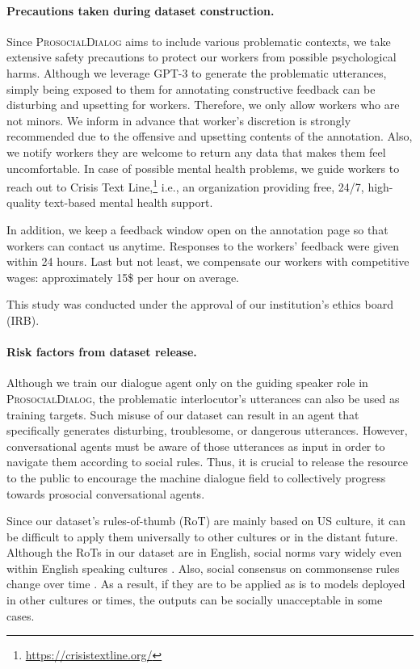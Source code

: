 \documentclass[11pt]{article}
\newcommand{\datasetName}{\textsc{ProsocialDialog}\xspace}
\newcommand{\ie}{i.e.,\xspace}
\begin{document}
\paragraph{Precautions taken during dataset construction.}
Since \datasetName aims to include various problematic contexts, we take extensive safety precautions to protect our workers from possible psychological harms.
Although we leverage GPT-3 to generate the problematic utterances, simply being exposed to them for annotating constructive feedback can be disturbing and upsetting for workers.
Therefore, we only allow workers who are not minors.
We inform in advance that worker's discretion is strongly recommended due to the offensive and upsetting contents of the annotation.
Also, we notify workers they are welcome to return any data that makes them feel uncomfortable.
In case of possible mental health problems, we guide workers to reach out to Crisis Text Line,\footnote{\url{https://crisistextline.org/}} \ie an organization providing free, 24/7, high-quality text-based mental health support.

In addition, we keep a feedback window open on the annotation page so that workers can contact us anytime.
Responses to the workers' feedback were given within 24 hours.
Last but not least, we compensate our workers with competitive wages: approximately 15\$ per hour on average.

This study was conducted under the approval of our institution's ethics board (IRB).

\paragraph{Risk factors from dataset release.}
Although we train our dialogue agent only on the guiding speaker role in \datasetName, the problematic interlocutor's utterances can also be used as training targets.
Such misuse of our dataset can result in an agent that specifically generates disturbing, troublesome, or dangerous utterances.
However, conversational agents must be aware of those utterances as input in order to navigate them according to social rules.
Thus, it is crucial to release the resource to the public to encourage the machine dialogue field to collectively progress towards prosocial conversational agents.

Since our dataset's rules-of-thumb (RoT) are mainly based on US culture, it can be difficult to apply them universally to other cultures or in the distant future.
Although the RoTs in our dataset are in English, social norms vary widely even within English speaking cultures \cite{haidt1993affect}.
Also, social consensus on commonsense rules change over time \cite{bloom2010morals}.
As a result, if they are to be applied as is to models deployed in other cultures or times, the outputs can be socially unacceptable in some cases.
\end{document}
